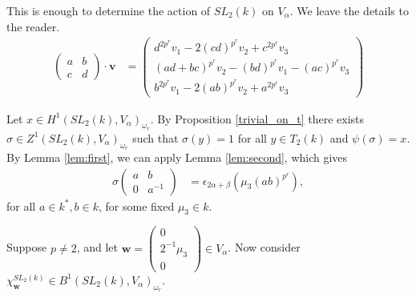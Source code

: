 This is enough to determine the action of $SL_2(k)$ on $V_\alpha$. We leave the details to the reader.
\begin{align*}
\left(\begin{matrix}a & b \\ c & d\end{matrix}\right) \cdot \mathbf{v} 
&= \left(\begin{matrix}
	d^{2p^r}v_1 - 2(cd)^{p^r}v_2 + c^{2p^r}v_3 \\
	(ad + bc)^{p^r}v_2 - (bd)^{p^r}v_1 - (ac)^{p^r}v_3 \\
	b^{2p^r}v_1 - 2(ab)^{p^r}v_2 + a^{2p^r}v_3
\end{matrix}\right)
\end{align*}

Let $x\in H^1(SL_2(k), V_\alpha)_{\omega_r}$. By Proposition \ref{trivial_on_t} there exists $\sigma\in Z^1(SL_2(k), V_\alpha)_{\omega_r}$ such that $\sigma(y) = 1$ for all $y\in T_2(k)$ and $\psi(\sigma) = x$. By Lemma \ref{lem:first}, we can apply Lemma \ref{lem:second}, which gives
\begin{align*}
	\sigma\left(\begin{matrix}a & b\\0 & a^{-1}\end{matrix}\right) &= \epsilon_{2\alpha+\beta}\left(\mu_3(ab)^{p^r}\right),
\end{align*}
for all $a\in k^*, b\in k$, for some fixed $\mu_3\in k$.

Suppose $p\neq 2$, and let $\mathbf{w} = \left(\begin{matrix}0\\2^{-1}\mu_3\\0\end{matrix}\right)\in V_\alpha$. Now consider $\chi^{SL_2(k)}_\mathbf{w} \in B^1(SL_2(k), V_\alpha)_{\omega_r}$.

